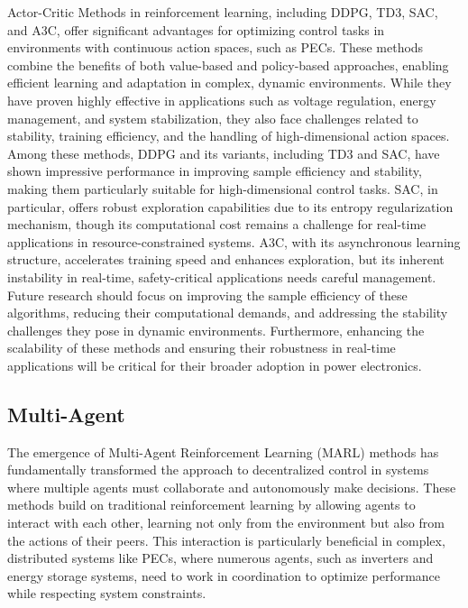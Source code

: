 Actor-Critic Methods in reinforcement learning, including DDPG, TD3, SAC, and A3C, offer significant advantages for optimizing control tasks in environments with continuous action spaces, such as PECs. These methods combine the benefits of both value-based and policy-based approaches, enabling efficient learning and adaptation in complex, dynamic environments. While they have proven highly effective in applications such as voltage regulation, energy management, and system stabilization, they also face challenges related to stability, training efficiency, and the handling of high-dimensional action spaces. Among these methods, DDPG and its variants, including TD3 and SAC, have shown impressive performance in improving sample efficiency and stability, making them particularly suitable for high-dimensional control tasks. SAC, in particular, offers robust exploration capabilities due to its entropy regularization mechanism, though its computational cost remains a challenge for real-time applications in resource-constrained systems. A3C, with its asynchronous learning structure, accelerates training speed and enhances exploration, but its inherent instability in real-time, safety-critical applications needs careful management. Future research should focus on improving the sample efficiency of these algorithms, reducing their computational demands, and addressing the stability challenges they pose in dynamic environments. Furthermore, enhancing the scalability of these methods and ensuring their robustness in real-time applications will be critical for their broader adoption in power electronics. 

\subsection{Multi-Agent}
\label{sec:ma_methods}

The emergence of Multi-Agent Reinforcement Learning (MARL) methods has fundamentally transformed the approach to decentralized control in systems where multiple agents must collaborate and autonomously make decisions. These methods build on traditional reinforcement learning by allowing agents to interact with each other, learning not only from the environment but also from the actions of their peers. This interaction is particularly beneficial in complex, distributed systems like PECs, where numerous agents, such as inverters and energy storage systems, need to work in coordination to optimize performance while respecting system constraints.

